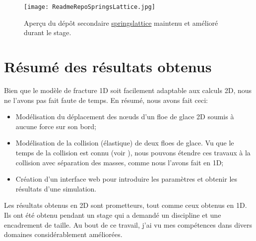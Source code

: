 \begin{figure}[!h]
    \centering
    \texttt{[image: ReadmeRepoSpringsLattice.jpg]}
    \caption{Aperçu du dépôt secondaire \href{https://framagit.org/RaK/SimuRessorts/-/tree/master}{springslattice} maintenu et amélioré durant le stage.}
    \label{fig:readme2d}
\end{figure}



\section{Résumé des résultats obtenus}

Bien que le modèle de fracture 1D soit facilement adaptable aux calculs 2D, nous ne l'avons pas fait faute de temps. En résumé, nous avons fait ceci:
\begin{itemize}
    \item Modélisation du déplacement des n\oe{}uds d'un floe de glace 2D soumis à aucune force sur son bord;
    \item Modélisation de la collision (élastique) de deux floes de glace. Vu que le temps de la collision est connu (voir \parencite{rabatel2015thesis}), nous pouvons étendre ces travaux à la collision avec séparation des masses, comme nous l'avons fait en 1D;
    \item Création d'un interface web pour introduire les paramètres et obtenir les résultats d'une simulation. 
\end{itemize}

Les résultats obtenus en 2D sont prometteurs, tout comme ceux obtenus en 1D. Ils ont été obtenu pendant un stage qui a demandé un discipline et une encadrement de taille. Au bout de ce travail, j'ai vu mes compétences dans divers domaines considérablement améliorées.
